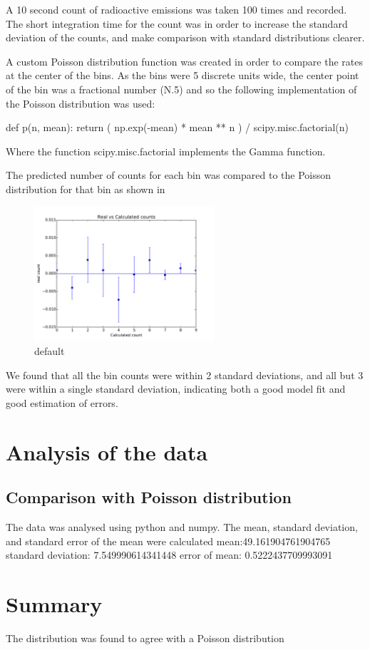 \documentclass[10pt]{iopart}
\begin{document}
A 10 second count of radioactive emissions was taken 100 times and recorded. The short integration time for the count was in order to increase the standard deviation of the counts, and make comparison with standard distributions clearer.

A custom Poisson distribution function was created in order to compare the rates at the center of the bins. As the bins were 5 discrete units wide, the center point of the bin was a fractional number (N.5) and so the following implementation of the Poisson distribution was used:

def p(n, mean):
	return ( np.exp(-mean) * mean ** n ) / scipy.misc.factorial(n)

Where the function scipy.misc.factorial implements the Gamma function.

The predicted number of counts for each bin was compared to the Poisson distribution for that bin as shown in \begin{figure}[htbp]
\begin{center}
\includegraphics[height=5cm]{errorcomp.pdf}
\caption{default}
\label{default}
\end{center}
\end{figure}
 We found that all the bin counts were within 2 standard deviations, and all but 3 were within a single standard deviation, indicating both a good model fit and good estimation of errors.


\section{Analysis of the data}

\subsection{Comparison with Poisson distribution}

The data was analysed using python and numpy. The mean, standard deviation, and standard error of the mean were calculated
mean:49.161904761904765
standard deviation: 7.549990614341448
error of mean: 0.5222437709993091

    
\section{Summary}

The distribution was found to agree with a Poisson distribution 

\printbibheading
\printbibliography
\end{document}
